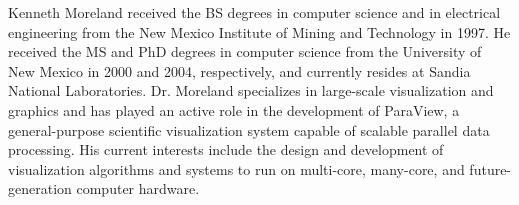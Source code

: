 \documentclass[journal,onecolumn,12pt,letterpaper,twoside]{IEEEtran}
\begin{document}



\begin{biography}{Kenneth Moreland}
  received the BS degrees in computer science and in electrical engineering
  from the New Mexico Institute of Mining and Technology in 1997.  He
  received the MS and PhD degrees in computer science from the University
  of New Mexico in 2000 and 2004, respectively, and currently resides at
  Sandia National Laboratories.  Dr. Moreland specializes in large-scale
  visualization and graphics and has played an active role in the
  development of ParaView, a general-purpose scientific visualization
  system capable of scalable parallel data processing.  His current
  interests include the design and development of visualization algorithms
  and systems to run on multi-core, many-core, and future-generation
  computer hardware.
\end{biography}
\end{document}

